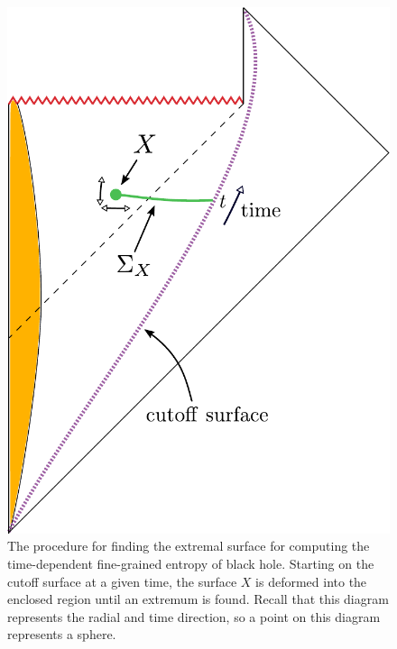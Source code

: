  \begin{figure}[t]
\begin{center}
\includegraphics[scale=0.4]{figures/bhprocedure.pdf}
\caption{The procedure for finding the extremal surface for computing the time-dependent fine-grained entropy of black hole. Starting on the cutoff surface at a given time, the surface $X$ is deformed into the enclosed region until an extremum is found.
Recall that this diagram represents the radial and time direction, so a point on this diagram represents a sphere.  }
\label{bhprocedure}
\end{center}
\end{figure} 


